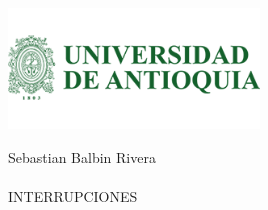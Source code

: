 \documentclass{letter}
\begin{document}
\begin{center}
\includegraphics[width=0.5\textwidth]{logo-udea.png}\\
\end{center}

Sebastian Balbin Rivera\\\\
INTERRUPCIONES\\
\end{document}
